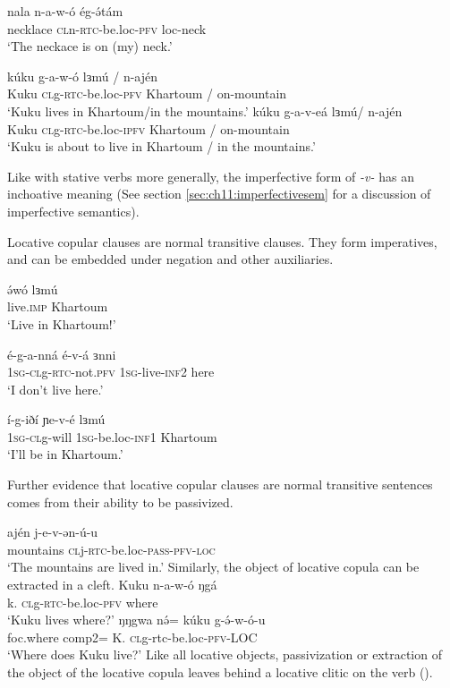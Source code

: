 	\ea 	\gll 	nala		n-a-w-ó 			ég-ə́tám	\\
					necklace	\textsc{cl}n-\textsc{rtc}-be.loc-\textsc{pfv} 	loc-neck\\
			\glt 	‘The neckace is on (my) neck.’	 \z 

\ea 
	\ea	\gll 	kúku		g-a-w-ó	      	lɜmú	/ n-ajén	\\
	 			Kuku 	\textsc{cl}g-\textsc{rtc}-be.loc-\textsc{pfv}	Khartoum / on-mountain 		\\
	 	\glt 	‘Kuku lives in Khartoum/in the mountains.’
	\ex	\gll 	kúku		g-a-v-eá	  	lɜmú/ n-ajén		\\
	 			Kuku 	\textsc{cl}g-\textsc{rtc}-be.loc-\textsc{ipfv}	Khartoum / on-mountain 	\\
	 	\glt 	‘Kuku is about to live in Khartoum / in the mountains.’ \z \z 

Like with stative verbs more generally, the imperfective form of \textit{-v-} has an inchoative meaning (See section \ref{sec:ch11:imperfectivesem} for a discussion of imperfective semantics).

Locative copular clauses are normal transitive clauses. They form imperatives, and can be embedded under negation and other auxiliaries. 

\ea \gll 		ə́wó 		lɜmú\\      
				live.\textsc{imp}	Khartoum\\
	\glt 	‘Live in Khartoum!’ \z 

\ea 
\ea \gll  	é-g-a-nná			é-v-á				ɜnni 	\\
			\textsc{1\textsc{sg}}-\textsc{cl}g-\textsc{rtc}-not.\textsc{pfv}	1\textsc{sg}-live-\textsc{inf}2		here\\
	\glt	 	‘I don’t live here.’										

\ex \gll    í-g-iðí 		ɲe-v-é		lɜmú\\
	 		1\textsc{sg}-\textsc{cl}g-will	1\textsc{sg}-be.loc-\textsc{inf}1	Khartoum\\
	\glt  	‘I’ll be in Khartoum.’					\z 					
\z 

Further evidence that locative copular clauses are normal transitive sentences comes from their ability to be passivized.

\ea \gll  ajén j-e-v-ən-ú-u\\
			mountains \textsc{cl}j-\textsc{rtc}-be.loc-\textsc{pass}-\textsc{pfv}-\textsc{loc}\\
	\glt 		`The mountains are lived in.'
\z 
Similarly, the object of locative copula can be extracted in a cleft.
\ea
\ea \gll  	Kuku		n-a-w-ó	 		ŋgá \\ 
			k.		\textsc{cl}g-\textsc{rtc}-be.loc-\textsc{pfv}	where\\ 
	\glt  	‘Kuku lives where?’
\ex \gll  	ŋŋgwa		nə́=	    kúku 	g-ə́-w-ó-u			 	\\
			foc.where	comp2= K.		\textsc{cl}g-rtc-be.loc-\textsc{pfv}-LOC \\
	 \glt 	‘Where does Kuku live?’ 						\z 
\z 
Like all locative objects, passivization or extraction of the object of the locative copula leaves behind a locative clitic on the verb (). %

